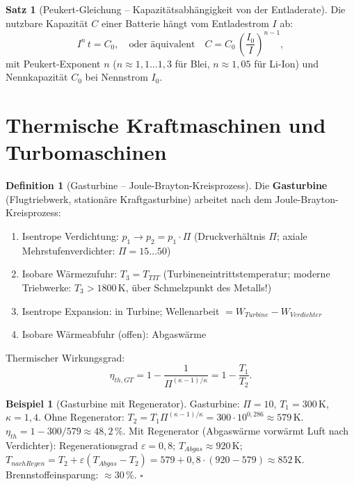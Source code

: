 ﻿\documentclass[a4paper,12pt]{report}
\theoremstyle{definition}
\newtheorem{definition}{Definition}
\newtheorem{beispiel}{Beispiel}
\newtheorem{satz}{Satz}
\begin{document}
\begin{satz}[Peukert-Gleichung -- Kapazitätsabhängigkeit von der Entladerate]
Die nutzbare Kapazität $C$ einer Batterie hängt vom Entladestrom $I$ ab:
\[
  I^n\,t = C_0, \quad \text{oder äquivalent}\quad C = C_0\,\left(\frac{I_0}{I}\right)^{n-1},
\]
mit Peukert-Exponent $n$ ($n \approx 1{,}1\ldots1{,}3$ für Blei, $n \approx 1{,}05$ für Li-Ion)
und Nennkapazität $C_0$ bei Nennstrom $I_0$.
\end{satz}



\section{Thermische Kraftmaschinen und Turbomaschinen}

\begin{definition}[Gasturbine -- Joule-Brayton-Kreisprozess]
Die \textbf{Gasturbine} (Flugtriebwerk, stationäre Kraftgasturbine) arbeitet
nach dem Joule-Brayton-Kreisprozess:
\begin{enumerate}
    \item Isentrope Verdichtung: $p_1 \to p_2 = p_1\cdot\Pi$
          (Druckverhältnis $\Pi$; axiale Mehrstufenverdichter: $\Pi = 15\ldots50$)
    \item Isobare Wärmezufuhr: $T_3 = T_{TIT}$ (Turbineneintrittstemperatur;
          moderne Triebwerke: $T_3 > 1800\,\mathrm{K}$, über Schmelzpunkt des Metalls!)
    \item Isentrope Expansion: in Turbine; Wellenarbeit $= W_{Turbine} - W_{Verdichter}$
    \item Isobare Wärmeabfuhr (offen): Abgaswärme
\end{enumerate}
Thermischer Wirkungsgrad:
\[
  \eta_{th,GT} = 1 - \frac{1}{\Pi^{(\kappa-1)/\kappa}} = 1 - \frac{T_1}{T_2}.
\]
\end{definition}

\begin{beispiel}[Gasturbine mit Regenerator]
Gasturbine: $\Pi = 10$, $T_1 = 300\,\mathrm{K}$, $\kappa = 1{,}4$.
Ohne Regenerator: $T_2 = T_1\Pi^{(\kappa-1)/\kappa} = 300\cdot10^{0{,}286} \approx 579\,\mathrm{K}$.
$\eta_{th} = 1 - 300/579 \approx 48{,}2\,\%$.
Mit Regenerator (Abgaswärme vorwärmt Luft nach Verdichter):
Regenerationsgrad $\varepsilon = 0{,}8$; $T_{Abgas} \approx 920\,\mathrm{K}$;
$T_{nach Regen} = T_2 + \varepsilon(T_{Abgas} - T_2) = 579 + 0{,}8\cdot(920-579) \approx 852\,\mathrm{K}$.
Brennstoffeinsparung: $\approx 30\,\%$. $\square$
\end{beispiel}
\end{document}

